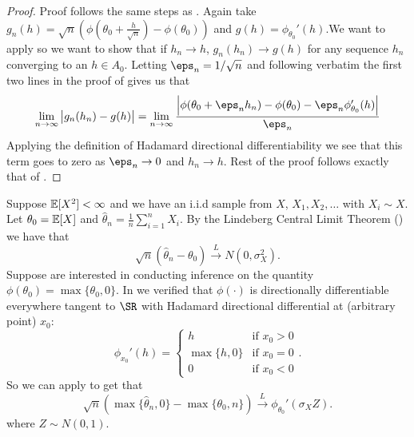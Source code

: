 \begin{proof}
	Proof follows the same steps as . Again take \(g_n(h) = \sqrt{n}\left(\phi(\theta_0 + \frac{h}{\sqrt{n}})-\phi(\theta_0)\right)\) and \(g(h) = \phi_{\theta_0}'(h)\).We want to apply  so we want to show that if \(h_n \to h \), \(g_n(h_n)\to g(h)\) for any sequence \(h_n\) converging to an \(h \in A_0\). Letting \(\eps_n=1/\sqrt{n}\) and following verbatim the first two lines in the proof of  gives us that
	\begin{align*}
	\lim_{n\to\infty}\left|g_n(h_n)-g(h)\right| = \lim_{n\to \infty}\frac{\left|\phi(\theta_0+\eps_nh_n)-\phi(\theta_0)-\eps_n\phi_{\theta_0}'(h)\right|}{\eps_n} 
	\end{align*}
	Applying the definition of Hadamard directional differentiability we see that this term goes to zero as \(\eps_n\to 0\) and \(h_n\to h\). Rest of the proof follows exactly that of .
\end{proof}
\begin{example}
	Suppose \(\mathbb{E}[X^2] < \infty\) and we have an i.i.d sample from \(X\), \(X_1,X_2,\dots\) with \(X_i\sim X\). Let \(\theta_0 = \mathbb{E}[X]\) and \(\hat \theta_n = \frac{1}{n}\sum_{i=1}^n X_i\). By the Lindeberg Central Limit Theorem () we have that
	\[
		\sqrt{n}\left(\hat\theta_n-\theta_0\right)\overset{L}{\to} N(0,\sigma_X^2)
	.\] 
	Suppose are interested in conducting inference on the quantity \(\phi(\theta_0) = \max\{\theta_0,0\}\). In  we verified that \(\phi(\cdot)\) is directionally differentiable everywhere tangent to \(\SR\) with Hadamard directional differential at (arbitrary point) \(x_0\):
	\[
		\phi_{x_0}'(h) = \begin{cases}
			h & \text{if }x_0 > 0 \\
			\max\{h,0\} & \text{if }x_0=0\\
			0 &\text{if }x_0 < 0
		\end{cases}
	.\] 
	So we can apply  to get that
	\[
		\sqrt{n}\left(\max\{\hat\theta_n,0\} - \max\{\theta_0,n\}  \right)\overset{L}{\to} \phi_{\theta_0}'(\sigma_X Z)
	.\] 
	where \(Z\sim N(0,1)\).
\end{example}

